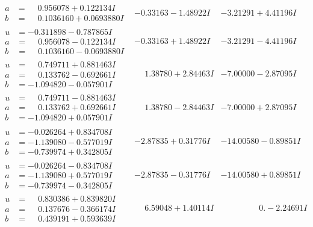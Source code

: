 \documentclass[1p]{elsarticle_modified}
\theoremstyle{definition}
\begin{document}
$$\begin{array}{c|c|c}
\begin{aligned}
a &= \phantom{-}0.956078 + 0.122134 I \\
b &= \phantom{-}0.1036160 + 0.0693880 I\end{aligned}
 & -0.33163 - 1.48922 I & -3.21291 + 4.41196 I \\ \hline\begin{aligned}
u &= -0.311898 - 0.787865 I \\
a &= \phantom{-}0.956078 - 0.122134 I \\
b &= \phantom{-}0.1036160 - 0.0693880 I\end{aligned}
 & -0.33163 + 1.48922 I & -3.21291 - 4.41196 I \\ \hline\begin{aligned}
u &= \phantom{-}0.749711 + 0.881463 I \\
a &= \phantom{-}0.133762 - 0.692661 I \\
b &= -1.094820 - 0.057901 I\end{aligned}
 & \phantom{-}1.38780 + 2.84463 I & -7.00000 - 2.87095 I \\ \hline\begin{aligned}
u &= \phantom{-}0.749711 - 0.881463 I \\
a &= \phantom{-}0.133762 + 0.692661 I \\
b &= -1.094820 + 0.057901 I\end{aligned}
 & \phantom{-}1.38780 - 2.84463 I & -7.00000 + 2.87095 I \\ \hline\begin{aligned}
u &= -0.026264 + 0.834708 I \\
a &= -1.139080 - 0.577019 I \\
b &= -0.739974 + 0.342805 I\end{aligned}
 & -2.87835 + 0.31776 I & -14.00580 - 0.89851 I \\ \hline\begin{aligned}
u &= -0.026264 - 0.834708 I \\
a &= -1.139080 + 0.577019 I \\
b &= -0.739974 - 0.342805 I\end{aligned}
 & -2.87835 - 0.31776 I & -14.00580 + 0.89851 I \\ \hline\begin{aligned}
u &= \phantom{-}0.830386 + 0.839820 I \\
a &= \phantom{-}0.137676 - 0.366174 I \\
b &= \phantom{-}0.439191 + 0.593639 I\end{aligned}
 & \phantom{-}6.59048 + 1.40114 I & \phantom{-0.000000 } 0. - 2.24691 I \\ \hline\begin{aligned}

\end{aligned}
\end{array}$$
\end{document}

